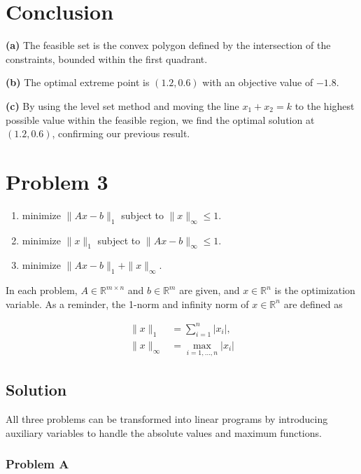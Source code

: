 \documentclass{article}
\begin{document}
\section*{Conclusion}

\textbf{(a)} The feasible set is the convex polygon defined by the intersection of the constraints, bounded within the first quadrant.

\textbf{(b)} The optimal extreme point is $(1.2, 0.6)$ with an objective value of $-1.8$.

\textbf{(c)} By using the level set method and moving the line $x_1 + x_2 = k$ to the highest possible value within the feasible region, we find the optimal solution at $(1.2, 0.6)$, confirming our previous result.

\section*{Problem 3}

\begin{enumerate}
    \item minimize $\|Ax - b\|_1$ subject to $\|x\|_\infty \leq 1$.
    \item minimize $\|x\|_1$ subject to $\|Ax - b\|_\infty \leq 1$.
    \item minimize $\|Ax - b\|_1 + \|x\|_\infty$.
\end{enumerate}

In each problem, $A \in \mathbb{R}^{m\times n}$ and $b \in \mathbb{R}^m$ are given, and $x \in \mathbb{R}^n$ is the optimization variable.
As a reminder, the 1-norm and infinity norm of $x \in \mathbb{R}^n$ are defined as

\begin{align*}
    \|x\|_1 &= \sum_{i=1}^n |x_i|, \\
    \|x\|_\infty &= \max_{i=1,\ldots,n} |x_i|
\end{align*}

\subsection*{Solution}

All three problems can be transformed into linear programs by introducing auxiliary variables to handle the absolute values and maximum functions.

\subsubsection*{Problem A}
\end{document}
